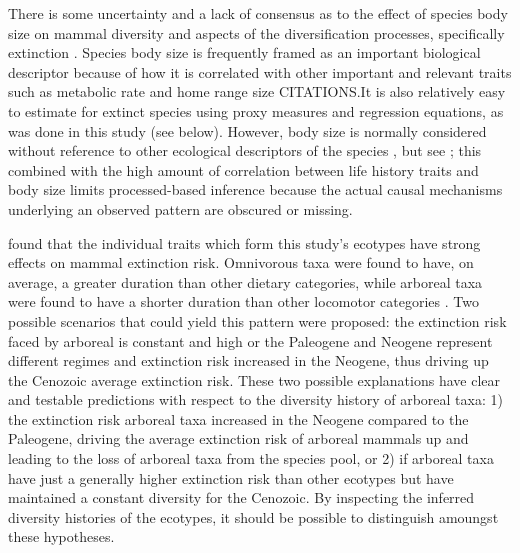 \documentclass[12pt,letterpaper]{article}
\begin{document}
There is some uncertainty and a lack of consensus as to the effect of species body size on mammal diversity and aspects of the diversification processes, specifically extinction \citep{Liow2008,Liow2009,Tomiya2013,Smits2015b}. Species body size is frequently framed as an important biological descriptor because of how it is correlated with other important and relevant traits such as metabolic rate and home range size CITATIONS.It is also relatively easy to estimate for extinct species using proxy measures and regression equations, as was done in this study (see below). However, body size is normally considered without reference to other ecological descriptors of the species \citep{Liow2008}, but see \citep{Smits2015b}; this combined with the high amount of correlation between life history traits and body size limits processed-based inference because the actual causal mechanisms underlying an observed pattern are obscured or missing.

\citet{Smits2015b} found that the individual traits which form this study's ecotypes have strong effects on mammal extinction risk. Omnivorous taxa were found to have, on average, a greater duration than other dietary categories, while arboreal taxa were found to have a shorter duration than other locomotor categories \citep{Smits2015b}. Two possible scenarios that could yield this pattern were proposed: the extinction risk faced by arboreal is constant and high or the Paleogene and Neogene represent different regimes and extinction risk increased in the Neogene, thus driving up the Cenozoic average extinction risk. These two possible explanations have clear and testable predictions with respect to the diversity history of arboreal taxa: 1) the extinction risk arboreal taxa increased in the Neogene compared to the Paleogene, driving the average extinction risk of arboreal mammals up and leading to the loss of arboreal taxa from the species pool, or 2) if arboreal taxa have just a generally higher extinction risk than other ecotypes but have maintained a constant diversity for the Cenozoic. By inspecting the inferred diversity histories of the ecotypes, it should be possible to distinguish amoungst these hypotheses.

\end{document}

